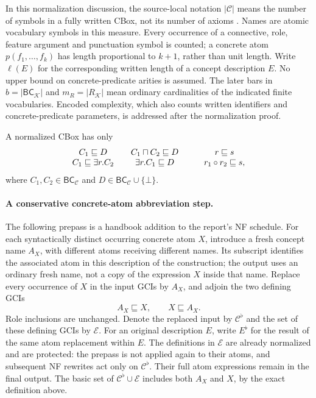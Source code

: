 In this normalization discussion, the source-local notation
\(|\mathcal C|\) means the number of symbols in a fully written CBox,
not its number of axioms
\cite[\S3.1, before lem.~2]{BaaderBrandtLutz2005TR}.
Names are atomic vocabulary symbols in this measure.  Every occurrence
of a connective, role, feature argument and punctuation symbol is counted;
a concrete atom \(p(f_1,\ldots,f_k)\) has length proportional to \(k+1\),
rather than unit length.  Write \(\ell(E)\) for the corresponding written
length of a concept description \(E\).
No upper bound on concrete-predicate arities is assumed.
The later bars in \(b=|\mathsf{BC}_{\mathcal K}|\) and
\(m_R=|R_{\mathcal K}|\) mean ordinary cardinalities of the indicated
finite vocabularies.  Encoded complexity, which also counts written
identifiers and concrete-predicate parameters, is addressed after the
normalization proof.

A normalized CBox has only
\[
\begin{array}{c@{\qquad}c}
 C_1\sqsubseteq D & C_1\sqcap C_2\sqsubseteq D\\
 C_1\sqsubseteq\exists r.C_2 & \exists r.C_1\sqsubseteq D
\end{array}
\qquad
\begin{array}{c}
 r\sqsubseteq s\\
 r_1\circ r_2\sqsubseteq s,
\end{array}
\]
where \(C_1,C_2\in\mathsf{BC}_{\mathcal C}\) and
\(D\in\mathsf{BC}_{\mathcal C}\cup\{\bot\}\).

\paragraph{A conservative concrete-atom abbreviation step.}
The following prepass is a handbook addition to the report's NF schedule.
For each syntactically distinct occurring concrete atom \(X\), introduce a
fresh concept name \(A_X\), with different atoms receiving different names.
Its subscript identifies the associated atom
in this description of the construction; the output uses an ordinary fresh
name, not a copy of the expression \(X\) inside that name.
Replace every occurrence of \(X\) in the input GCIs by \(A_X\), and
adjoin the two defining GCIs
\[
 A_X\sqsubseteq X,\qquad X\sqsubseteq A_X.
 \tag{N0}
\]
Role inclusions are unchanged.  Denote the replaced input by
\(\mathcal C^\flat\) and the set of these defining GCIs by
\(\mathcal E\).  For an original description \(E\), write \(E^\flat\)
for the result of the same atom replacement within \(E\).
The definitions in \(\mathcal E\) are already normalized and are
protected: the prepass is not applied again to their atoms, and subsequent
NF rewrites act only on \(\mathcal C^\flat\).
Their full atom expressions remain in the final output.
The basic set of \(\mathcal C^\flat\cup\mathcal E\) includes both
\(A_X\) and \(X\), by the exact definition above.

